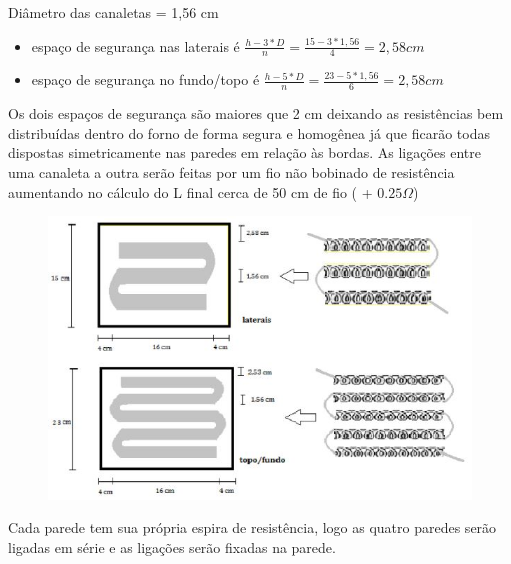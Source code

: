 Diâmetro das canaletas = 1,56 cm
\begin{itemize}
	\item espaço de segurança nas laterais é $\frac{h-3*D}{n} = \frac{15 - 3 * 1,56}{4} = 2,58 cm$
	\item espaço de segurança no fundo/topo é $\frac{h-5*D}{n} = \frac{23 - 5 * 1,56}{6} = 2,58 cm$
\end{itemize}

Os dois espaços de segurança são maiores que 2 cm deixando as resistências bem distribuídas dentro do forno de forma segura e homogênea já que ficarão todas dispostas simetricamente nas paredes em relação às bordas.
As ligações entre uma canaleta a outra serão feitas por um fio não bobinado de resistência aumentando no cálculo do L final cerca de 50 cm de fio ( + $0.25\Omega$)

\begin{figure}[!ht]
	\centering
	\label{resistencia3}
	\includegraphics[keepaspectratio=true,scale=1.0]{figuras/alimentacao5.JPG}
\end{figure}

Cada parede tem sua própria espira de resistência, logo as quatro paredes serão ligadas em série e as ligações serão fixadas na parede.

